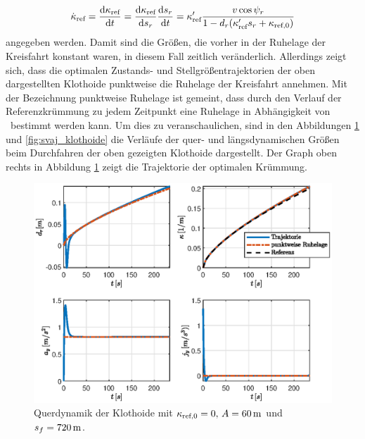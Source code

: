 \begin{equation}
	\dot{\kappa}_{\textrm{ref}} = \frac{\textrm{d}{\ensuremath{\kappa_{\textrm{ref}}}}}{\textrm{d}{t}} = \frac{\textrm{d}{\ensuremath{\kappa_{\textrm{ref}}}}}{\textrm{d}{s_r}} \frac{\textrm{d}{s_r}}{\textrm{d}{t}} = \kappa'_{\textrm{ref}} \frac{v\cos{\psi_r}}{1-d_r(\kappa'_{\textrm{ref}} s_r + \kappa_{\textrm{ref},0})}
\end{equation} 
angegeben werden. Damit sind die Größen, die vorher in der Ruhelage der Kreisfahrt konstant waren, in diesem Fall zeitlich veränderlich. Allerdings zeigt sich, dass die optimalen Zustands- und Stellgrößentrajektorien der oben dargestellten Klothoide punktweise die Ruhelage der Kreisfahrt annehmen. Mit der Bezeichnung punktweise Ruhelage ist gemeint, dass durch den Verlauf der Referenzkrümmung zu jedem Zeitpunkt eine Ruhelage in Abhängigkeit von \kapparefofs~bestimmt werden kann. Um dies zu veranschaulichen, sind in den Abbildungen \ref{fig:lat_dyn_klothoide} und \ref{fig:svaj_klothoide} die Verläufe der quer- und längsdynamischen Größen beim Durchfahren der oben gezeigten Klothoide dargestellt. Der Graph oben rechts in Abbildung \ref{fig:lat_dyn_klothoide} zeigt die Trajektorie der optimalen Krümmung. 
\begin{figure}[h] 
	\centering
	\includegraphics[width=\linewidth]{./Bilder/Ergebnisse/Klothoide/Ohne_umax/lat_dyn.eps}
	\caption{Querdynamik der Klothoide mit $\kappa_{\textrm{ref},0} = 0,\, A = 60\,\mathrm{m}$ und $s_f = 720\,\mathrm{m}$.}
	\label{fig:lat_dyn_klothoide}
\end{figure} 
